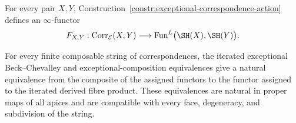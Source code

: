 \begin{proposition}
\label{prop:exceptional-correspondence-extension}
For every pair \(X,Y\), Construction~\ref{constr:exceptional-correspondence-action}
defines an \(\infty\)-functor
\[
    F_{X,Y}:
    \operatorname{Corr}_{\mathcal E}(X,Y)
    \longrightarrow
    \operatorname{Fun}^L
    \bigl(
      \SH(X),
      \SH(Y)
    \bigr).
\]

For every finite composable string of correspondences, the iterated
exceptional Beck--Chevalley and exceptional-composition equivalences give
a natural equivalence from the composite of the assigned functors to the
functor assigned to the iterated derived fibre product.  These equivalences
are natural in proper maps of all apices and are compatible with every face,
degeneracy, and subdivision of the string.
\end{proposition}

